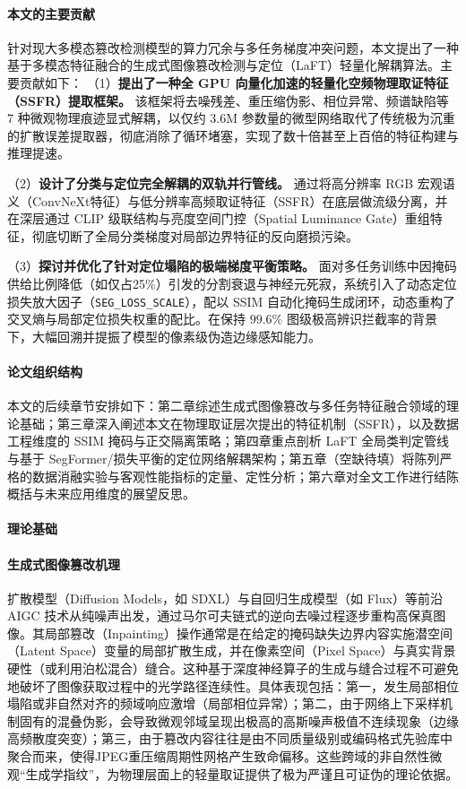 \documentclass[10pt,a4paper,twocolumn]{ctexart}
\begin{document}
\paragraph{本文的主要贡献}
针对现大多模态篡改检测模型的算力冗余与多任务梯度冲突问题，本文提出了一种基于多模态特征融合的生成式图像篡改检测与定位（LaFT）轻量化解耦算法。主要贡献如下：
（1）\textbf{提出了一种全 GPU 向量化加速的轻量化空频物理取证特征（SSFR）提取框架。} 该框架将去噪残差、重压缩伪影、相位异常、频谱缺陷等 7 种微观物理痕迹显式解耦，以仅约 3.6M 参数量的微型网络取代了传统极为沉重的扩散误差提取器，彻底消除了循环堵塞，实现了数十倍甚至上百倍的特征构建与推理提速。

（2）\textbf{设计了分类与定位完全解耦的双轨并行管线。} 通过将高分辨率 RGB 宏观语义（ConvNeXt特征）与低分辨率高频取证特征（SSFR）在底层做流级分离，并在深层通过 CLIP 级联结构与亮度空间门控（Spatial Luminance Gate）重组特征，彻底切断了全局分类梯度对局部边界特征的反向磨损污染。

（3）\textbf{探讨并优化了针对定位塌陷的极端梯度平衡策略。} 面对多任务训练中因掩码供给比例降低（如仅占25\%）引发的分割衰退与神经元死寂，系统引入了动态定位损失放大因子（\texttt{SEG\_LOSS\_SCALE}），配以 SSIM 自动化掩码生成闭环，动态重构了交叉熵与局部定位损失权重的配比。在保持 $99.6\%$ 图级极高辨识拦截率的背景下，大幅回溯并提振了模型的像素级伪造边缘感知能力。

\paragraph{论文组织结构}
本文的后续章节安排如下：第二章综述生成式图像篡改与多任务特征融合领域的理论基础；第三章深入阐述本文在物理取证层次提出的特征机制（SSFR），以及数据工程维度的 SSIM 掩码与正交隔离策略；第四章重点剖析 LaFT 全局类判定管线与基于 SegFormer/损失平衡的定位网络解耦架构；第五章（空缺待填）将陈列严格的数据消融实验与客观性能指标的定量、定性分析；第六章对全文工作进行结陈概括与未来应用维度的展望反思。

\paragraph{理论基础}

\paragraph{生成式图像篡改机理}
扩散模型（Diffusion Models，如 SDXL）与自回归生成模型（如 Flux）等前沿 AIGC 技术从纯噪声出发，通过马尔可夫链式的逆向去噪过程逐步重构高保真图像。其局部篡改（Inpainting）操作通常是在给定的掩码缺失边界内容实施潜空间（Latent Space）变量的局部扩散生成，并在像素空间（Pixel Space）与真实背景硬性（或利用泊松混合）缝合。这种基于深度神经算子的生成与缝合过程不可避免地破坏了图像获取过程中的光学路径连续性。具体表现包括：第一，发生局部相位塌陷或非自然对齐的频域响应激增（局部相位异常）；第二，由于网络上下采样机制固有的混叠伪影，会导致微观邻域呈现出极高的高斯噪声极值不连续现象（边缘高频散度突变）；第三，由于篡改内容往往是由不同质量级别或编码格式先验库中聚合而来，使得JPEG重压缩周期性网格产生致命偏移。这些跨域的非自然性微观“生成学指纹”，为物理层面上的轻量取证提供了极为严谨且可证伪的理论依据。
\end{document}

